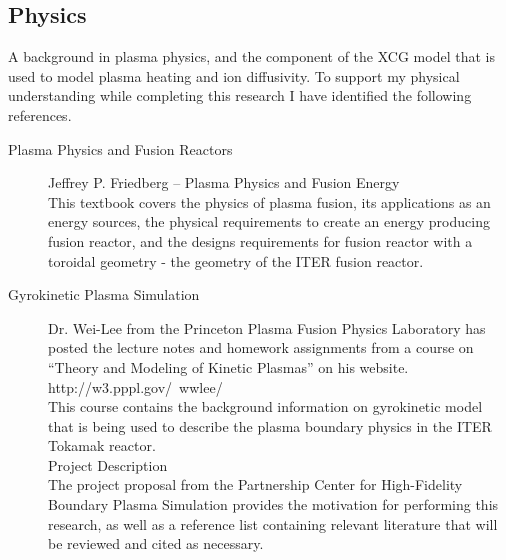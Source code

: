 \documentclass{article}
\begin{document}
\subsection*{Physics}
A background in plasma physics, and the component of the XCG model that is used to model plasma heating and ion diffusivity. To support my physical understanding while completing this research I have identified the following references.\\
\begin{description}
\item[Plasma Physics and Fusion Reactors]
Jeffrey P. Friedberg – Plasma Physics and Fusion Energy\\
This textbook covers the physics of plasma fusion, its applications as an energy sources, the physical requirements to create an energy producing fusion reactor, and the designs requirements for fusion reactor with a toroidal geometry - the geometry of the ITER fusion reactor.\\
\item[Gyrokinetic Plasma Simulation]
Dr. Wei-Lee from the Princeton Plasma Fusion Physics Laboratory has posted the lecture notes and homework assignments from a course on “Theory and Modeling of Kinetic Plasmas” on his website.\\
http://w3.pppl.gov/~wwlee/\\
 This course contains the background information on gyrokinetic model that is being used to describe the plasma boundary physics in the ITER Tokamak reactor. \\
Project Description\\
The project proposal from the Partnership Center for High-Fidelity Boundary Plasma Simulation provides the motivation for performing this research, as well as a reference list containing relevant literature that will be reviewed and cited as necessary. \\


\end{description}
\end{document}
